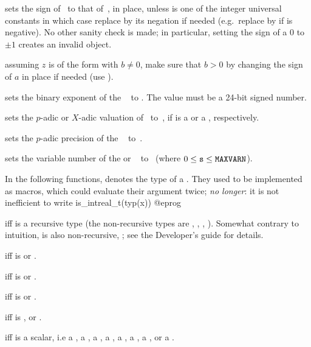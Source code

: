  sets the sign of~ to that
of~, in place, unless  is one of the integer universal
constants in which case replace  by its negation if needed
(e.g.~replace  by  if  is negative). No other
sanity check is made; in particular, setting the sign of a $0$
 to $\pm1$ creates an invalid object.

 assuming $z$ is of the form 
with $b\neq 0$, make sure that $b > 0$ by changing the sign of $a$ in place if
needed (use ).

 sets the binary exponent of the
~ to . The value  must be a 24-bit signed
number.

 sets the $p$-adic or $X$-adic valuation
of~ to~, if  is a  or a ,
respectively.

 sets the $p$-adic precision of the
~ to~.

 sets the variable number of the 
or ~ to~ (where $0\le {\tt s}\le{\tt MAXVARN}$).

\label{se:typegroup}
In the following functions,  denotes the type of a .
They used to be implemented as macros, which could evaluate their argument
twice; \emph{no longer}: it is not inefficient to write
\bprog
  is_intreal_t(typ(x))
@eprog

  iff  is a recursive
type (the non-recursive types are , ,
, ). Somewhat contrary to intuition,  is
also non-recursive, ; see the Developer's guide for details.

  iff  is 
or .

  iff  is 
or .

  iff  is 
or .

  iff  is , 
or .

  iff  is a scalar, i.e
a ,
a ,
a ,
a ,
a ,
a ,
a ,
or
a .

